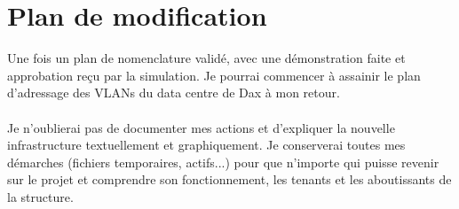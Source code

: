\section{Plan de modification}

Une fois un plan de nomenclature validé, avec une démonstration faite et approbation reçu par la simulation. Je pourrai commencer à assainir le plan d'adressage des VLANs du data centre de Dax à mon retour.
\\ \\
Je n'oublierai pas de documenter mes actions et d'expliquer la nouvelle infrastructure textuellement et graphiquement. Je conserverai toutes mes démarches (fichiers temporaires, actifs...) pour que n'importe qui puisse revenir sur le projet et comprendre son fonctionnement, les tenants et les aboutissants de la structure.
